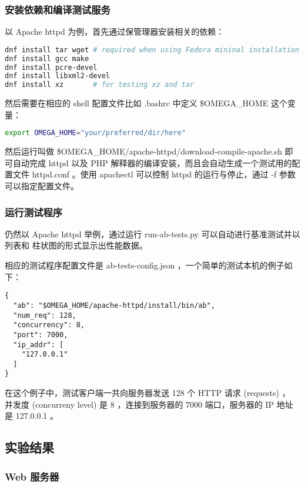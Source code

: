 \subsubsection{安装依赖和编译测试服务}

以 Apache httpd 为例，首先通过保管理器安装相关的依赖：

\begin{lstlisting}[language=bash]
dnf install tar wget # required when using Fedora mininal installation
dnf install gcc make
dnf install pcre-devel
dnf install libxml2-devel
dnf install xz       # for testing xz and tar
\end{lstlisting}

然后需要在相应的 shell 配置文件比如 .bashrc 中定义 \$OMEGA\_HOME 这个变量：

\begin{lstlisting}[language=bash]
export OMEGA_HOME="your/preferred/dir/here"
\end{lstlisting}

然后运行叫做 \$OMEGA\_HOME/apache-httpd/download-compile-apache.sh 即可自动完成
httpd 以及 PHP 解释器的编译安装，而且会自动生成一个测试用的配置文件 httpd.conf 。使用
apachectl 可以控制 httpd 的运行与停止，通过 -f 参数可以指定配置文件。

\subsubsection{运行测试程序}

仍然以 Apache httpd 举例，通过运行 run-ab-tests.py 可以自动进行基准测试并以列表和
柱状图的形式显示出性能数据。

相应的测试程序配置文件是 ab-tests-config.json ，一个简单的测试本机的例子如下：

\begin{lstlisting}
{
  "ab": "$OMEGA_HOME/apache-httpd/install/bin/ab",
  "num_req": 128,
  "concurrency": 8,
  "port": 7000,
  "ip_addr": [
    "127.0.0.1"
  ]
}
\end{lstlisting}

在这个例子中，测试客户端一共向服务器发送 128 个 HTTP 请求 (requests) ，
并发度 (concurreny level) 是 8 ，连接到服务器的 7000 端口，服务器的 IP 地址是
127.0.0.1 。

\subsection{实验结果}

\subsubsection{Web 服务器}

